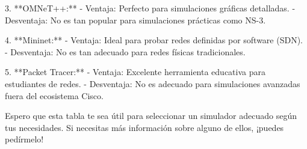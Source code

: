 3. **OMNeT++:**  
   - Ventaja: Perfecto para simulaciones gráficas detalladas.  
   - Desventaja: No es tan popular para simulaciones prácticas como NS-3.

4. **Mininet:**  
   - Ventaja: Ideal para probar redes definidas por software (SDN).  
   - Desventaja: No es tan adecuado para redes físicas tradicionales.

5. **Packet Tracer:**  
   - Ventaja: Excelente herramienta educativa para estudiantes de redes.  
   - Desventaja: No es adecuado para simulaciones avanzadas fuera del ecosistema Cisco.

Espero que esta tabla te sea útil para seleccionar un simulador adecuado según tus necesidades. Si necesitas más información sobre alguno de ellos, ¡puedes pedírmelo!
